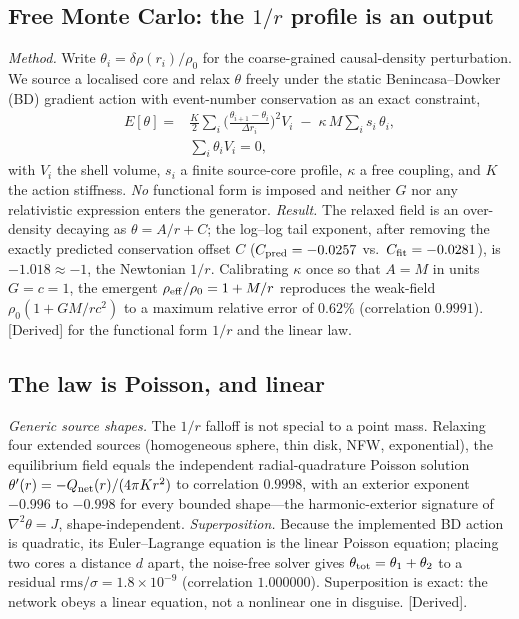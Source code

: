 \documentclass[aps,prd,reprint,nofootinbib,superscriptaddress,floatfix]{revtex4-2}
\theoremstyle{plain}
\newcommand{\Sderiv}{\textsf{[Derived]}}
\begin{document}
\subsection{Free Monte Carlo: the $1/r$ profile is an output}
\emph{Method.} Write $\theta_i=\delta\rho(r_i)/\rho_0$ for the coarse-grained
causal-density perturbation. We source a localised core and relax $\theta$ freely
under the static Benincasa--Dowker (BD) gradient action with event-number
conservation as an exact constraint,
\begin{equation}
\begin{split}
E[\theta]={}&\frac{K}{2}\sum_i\Big(\frac{\theta_{i+1}-\theta_i}{\Delta r_i}\Big)^2 V_i
\;-\;\kappa\,M\sum_i s_i\,\theta_i,\\
&\sum_i\theta_i V_i=0,
\end{split}
\label{eq:BDenergy}
\end{equation}
with $V_i$ the shell volume, $s_i$ a finite source-core profile, $\kappa$ a free
coupling, and $K$ the action stiffness. \emph{No} functional form is imposed and
neither $G$ nor any relativistic expression enters the generator. \emph{Result.} The
relaxed field is an over-density decaying as $\theta=A/r+C$; the log--log tail
exponent, after removing the exactly predicted conservation offset $C$
($C_{\rm pred}=-0.0257$ vs.\ $C_{\rm fit}=-0.0281$), is $-1.018\approx-1$, the
Newtonian $1/r$. Calibrating $\kappa$ once so that $A=M$ in units $G=c=1$, the
emergent $\rho_{\rm eff}/\rho_0=1+M/r$ reproduces the weak-field
$\rho_0(1+GM/rc^2)$ to a maximum relative error of $0.62\%$ (correlation $0.9991$).
\Sderiv{} for the functional form $1/r$ and the linear law.

\subsection{The law is Poisson, and linear}
\emph{Generic source shapes.} The $1/r$ falloff is not special to a point mass.
Relaxing four extended sources (homogeneous sphere, thin disk, NFW, exponential), the
equilibrium field equals the independent radial-quadrature Poisson solution
$\theta'(r)=-Q_{\rm net}(r)/(4\pi K r^2)$ to correlation $0.9998$, with an exterior
exponent $-0.996$ to $-0.998$ for every bounded shape---the harmonic-exterior
signature of $\nabla^2\theta=J$, shape-independent. \emph{Superposition.} Because the
implemented BD action is quadratic, its Euler--Lagrange equation is the linear
Poisson equation; placing two cores a distance $d$ apart, the noise-free solver gives
$\theta_{\rm tot}=\theta_1+\theta_2$ to a residual $\mathrm{rms}/\sigma=1.8\times
10^{-9}$ (correlation $1.000000$). Superposition is exact: the network obeys a linear
equation, not a nonlinear one in disguise. \Sderiv{}.
\end{document}
